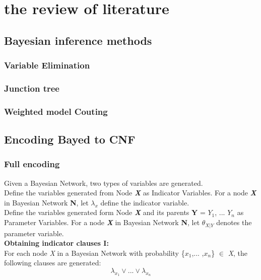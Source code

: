 \section{the review of literature}
    \subsection{Bayesian inference methods}
        \subsubsection{Variable Elimination}
        \subsubsection{Junction tree}
        \subsubsection{Weighted model Couting}
    \subsection{Encoding Bayed to CNF}
        \subsubsection{Full encoding}
            Given a Bayesian Network, two types of variables are generated.\\
            Define the variables generated from Node \textbf{\textit{X}} as Indicator Variables.
            For a node \textbf{\textit{X}} in Bayesian Network \textbf{N}, let $\lambda_x$ define the indicator variable. \\
            Define the variables generated form Node \textbf{\textit{X}} and its parents \textbf{Y} = {$Y_{1}$, ... $Y_{n}$} as Parameter Variables.
            For a node \textbf{\textit{X}} in Bayesian Network \textbf{N}, let $\theta_{X|Y}$ denotes the parameter variable.\\
            \textbf{Obtaining indicator clauses \textsc{I}:}\\
            For each node \textit{X} in a Bayesian Network with probability \{$x_{1}$,... ,$x_{n}$\} $\in$ \textit{X}, the following clauses are generated:
            \begin{equation}\label{fullenc_ic1}
                \lambda_{x_{1}} \vee ... \vee \lambda_{x_{n}}
            \end{equation}
            
